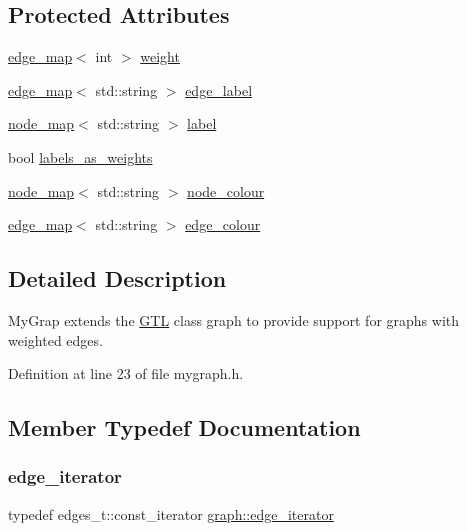 \subsection*{Protected Attributes}
\begin{DoxyCompactItemize}
\item 
\mbox{\hyperlink{classedge__map}{edge\+\_\+map}}$<$ int $>$ \mbox{\hyperlink{class_my_graph_aa6e12f16153220780e9db1eb30112b34}{weight}}
\item 
\mbox{\hyperlink{classedge__map}{edge\+\_\+map}}$<$ std\+::string $>$ \mbox{\hyperlink{class_my_graph_ac87b3f22352ddc7ec3864173a0d69cdd}{edge\+\_\+label}}
\item 
\mbox{\hyperlink{classnode__map}{node\+\_\+map}}$<$ std\+::string $>$ \mbox{\hyperlink{class_my_graph_a5c9923e2b43cb5a3139715acc34b8ca8}{label}}
\item 
bool \mbox{\hyperlink{class_my_graph_a1c451264db5a154029533d9368b90317}{labels\+\_\+as\+\_\+weights}}
\item 
\mbox{\hyperlink{classnode__map}{node\+\_\+map}}$<$ std\+::string $>$ \mbox{\hyperlink{class_my_graph_aa42370fd94b5789077f0ad70b76e4285}{node\+\_\+colour}}
\item 
\mbox{\hyperlink{classedge__map}{edge\+\_\+map}}$<$ std\+::string $>$ \mbox{\hyperlink{class_my_graph_aa10654166ca504696731c7f8011a5680}{edge\+\_\+colour}}
\end{DoxyCompactItemize}


\subsection{Detailed Description}
My\+Grap extends the \mbox{\hyperlink{namespace_g_t_l}{G\+TL}} class graph to provide support for graphs with weighted edges. 

Definition at line 23 of file mygraph.\+h.



\subsection{Member Typedef Documentation}
\mbox{\label{classgraph_a818d3766018eb0af91d520ce2150203c}} 
\subsubsection{\texorpdfstring{edge\+\_\+iterator}{edge\_iterator}}
{\footnotesize\ttfamily typedef edges\+\_\+t\+::const\+\_\+iterator \mbox{\hyperlink{classgraph_a818d3766018eb0af91d520ce2150203c}{graph\+::edge\+\_\+iterator}}\hspace{0.3cm}{\ttfamily [inherited]}}



